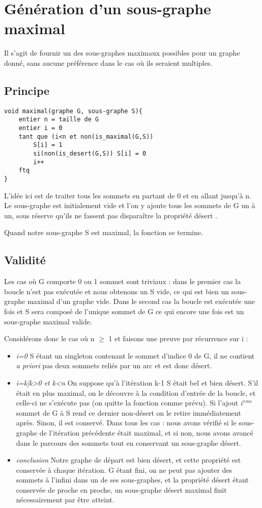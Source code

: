 \section{Génération d'un sous-graphe maximal}

Il s'agit de fournir un des sous-graphes maximaux  possibles pour un graphe donné, sans aucune préférence dans le cas où ils seraient multiples. 

\subsection{Principe}

\begin{verbatim}
void maximal(graphe G, sous-graphe S){
    entier n = taille de G
    entier i = 0
    tant que (i<n et non(is_maximal(G,S))
        S[i] = 1
        si(non(is_desert(G,S)) S[i] = 0
        i++
    ftq
}
\end{verbatim}
L'idée ici est de traiter tous les sommets en partant de 0 et en allant jusqu'à n. Le sous-graphe est initialement vide et l'on y ajoute tous les sommets de G un à un, sous réserve qu'ils ne fassent pas disparaître la propriété \og désert \fg.

Quand notre sous-graphe S est maximal, la fonction se termine.

\subsection{Validité}

Les cas où G comporte 0 ou 1 sommet sont triviaux : dans le premier cas la boucle n'est pas exécutée et nous obtenons un S vide, ce qui est bien un sous-graphe maximal d'un graphe vide. Dans le second cas la boucle est exécutée une fois et S sera composé de l'unique sommet de G ce qui encore une fois est un sous-graphe maximal valide. 

Considérons donc le cas où n $\geq$ 1 et faisons une preuve par récurrence sur i :
\begin{itemize}
	\item{\emph{i=0}} S étant un singleton contenant le sommet d'indice 0 de G, il ne contient \textit{a priori} pas deux sommets reliés par un arc et est donc désert.
	\item{\emph{i=k|k>0 et k<n}} On suppose qu'à l'itération k-1 S était bel et bien désert. S'il était en plus maximal, on le découvre à la condition d'entrée de la boucle, et celle-ci ne s'exécute pas (on quitte la fonction comme prévu). Si l'ajout $i^{eme}$ sommet de G à S rend ce dernier non-désert on le retire immédiatement après. Sinon, il est conservé. Dans tous les cas : nous avons vérifié si le sous-graphe de l'itération précédente était maximal, et si non, nous avons avancé dans le parcours des sommets tout en conservant un sous-graphe désert.
	\item{\emph{conclusion}} Notre graphe de départ est bien désert, et cette propriété est conservée à chaque itération. G étant fini, on ne peut pas ajouter des sommets à l'infini dans un de ses sous-graphes, et la propriété \og désert \fg{} étant conservée de proche en proche, un sous-graphe désert maximal finit nécessairement par être atteint. 
\end{itemize}


